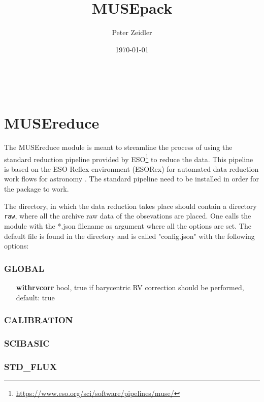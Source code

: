 \documentclass{pz_thesis}
\title{MUSEpack}
\author{Peter Zeidler}
\date{\today}
\begin{document}
\maketitle
\tableofcontents
\listoffigures
\listoftables
\newpage
\thispagestyle{empty}
\mbox{    }

\section{MUSEreduce}

The MUSEreduce module is meant to streamline the process of using the standard reduction pipeline provided by ESO\footnote{\url{https://www.eso.org/sci/software/pipelines/muse/}} \citep{Weilbacher_12,Weilbacher_14} to reduce the data. This pipeline is based on the ESO Reflex environment (ESORex) for automated data reduction work flows for astronomy \citep{Freudling_13}. The standard pipeline need to be installed in order for the package to work.

The directory, in which the data reduction takes place should contain a directory \texttt{raw}, where all the archive raw data of the obsevations are placed. One calls the module with the *.json filename as argument where all the options are set. The default file is found in the directory and is called "config.json" with the following options:

\subsubsection{GLOBAL}

\begin{itemize}
	\item[\textbf{withrvcorr}] bool, true if barycentric RV correction should be performed, default: true 
\end{itemize}

\subsubsection{CALIBRATION}

\subsubsection{SCIBASIC}

\subsubsection{STD\_FLUX}
\end{document}
